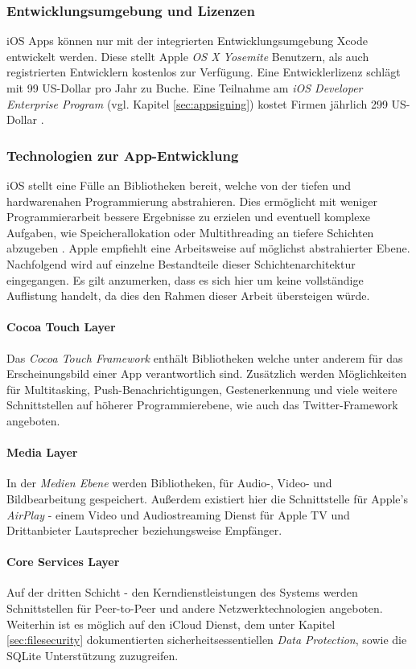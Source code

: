 	\subsubsection{Entwicklungsumgebung und Lizenzen}
		iOS Apps können nur mit der integrierten Entwicklungsumgebung Xcode
		entwickelt werden. Diese stellt Apple \textsl{OS X Yosemite}
		Benutzern, als auch registrierten Entwicklern kostenlos zur Verfügung.
		Eine Entwicklerlizenz schlägt mit 99 US-Dollar pro Jahr zu Buche. Eine
		Teilnahme am \textsl{iOS Developer Enterprise Program} (vgl. Kapitel
		\ref{sec:appsigning}) kostet Firmen jährlich 299 US-Dollar
		\cite{AppleDev2015}.
	\subsubsection{Technologien zur App-Entwicklung}
		iOS stellt eine Fülle an Bibliotheken bereit, welche von der
		tiefen und hardwarenahen Programmierung abstrahieren. Dies ermöglicht mit
		weniger Programmierarbeit bessere Ergebnisse zu erzielen und eventuell
		komplexe Aufgaben, wie Speicherallokation oder Multithreading an tiefere
		Schichten abzugeben \cite{AboutiOSTech2015}.
		Apple empfiehlt eine Arbeitsweise auf möglichst abstrahierter Ebene.
		Nachfolgend wird auf einzelne Bestandteile dieser Schichtenarchitektur
		eingegangen. Es gilt anzumerken, dass es sich hier um keine vollständige
		Auflistung handelt, da dies den Rahmen dieser Arbeit übersteigen würde.
		\paragraph{Cocoa Touch Layer}
			Das \textsl{Cocoa Touch Framework} enthält Bibliotheken welche unter anderem
			für das Erscheinungsbild einer App verantwortlich sind. Zusätzlich werden
			Möglichkeiten für Multitasking, Push-Benachrichtigungen, Gestenerkennung und
			viele weitere Schnittstellen auf höherer Programmierebene, wie auch
			das Twitter-Framework angeboten.
		\paragraph{Media Layer}
			In der \textsl{Medien Ebene} werden Bibliotheken, für
			Audio-, Video- und Bildbearbeitung gespeichert. Außerdem existiert hier die
			Schnittstelle für Apple's \textsl{AirPlay} - einem Video und Audiostreaming
			Dienst für Apple TV und Drittanbieter Lautsprecher beziehungsweise Empfänger.
		\paragraph{Core Services Layer}
			Auf der dritten Schicht - den Kerndienstleistungen des Systems werden
			Schnittstellen für Peer-to-Peer und andere Netzwerktechnologien angeboten.
			Weiterhin ist es möglich auf den iCloud Dienst, dem unter Kapitel
			\ref{sec:filesecurity} dokumentierten sicherheitsessentiellen \textsl{Data
			Protection}, sowie die SQLite Unterstützung zuzugreifen.
